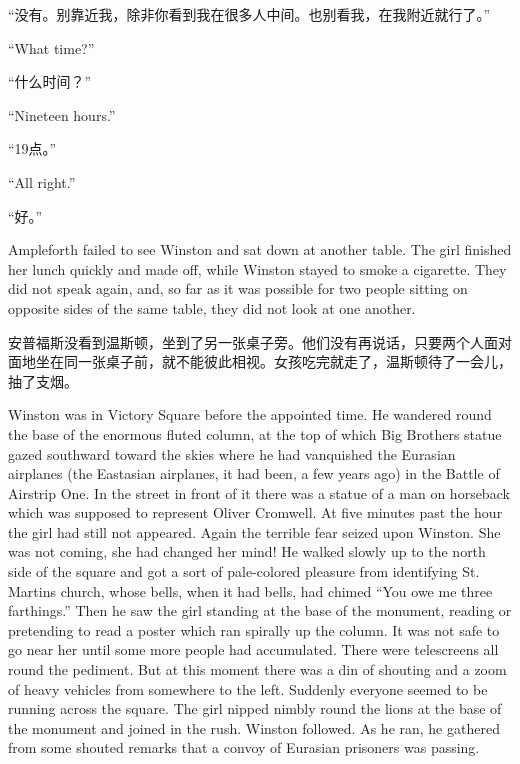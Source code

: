 \begin{paracol}{2}
\switchcolumn

``没有。别靠近我，除非你看到我在很多人中间。也别看我，在我附近就行了。''

\switchcolumn*

``What time?''

\switchcolumn

``什么时间？''

\switchcolumn*

``Nineteen hours.''

\switchcolumn

``19点。''

\switchcolumn*

``All right.''

\switchcolumn

``好。''

\switchcolumn*

Ampleforth failed to see Winston and sat down at another table. The girl
finished her lunch quickly and made off, while Winston stayed to smoke a
cigarette. They did not speak again, and, so far as it was possible for
two people sitting on opposite sides of the same table, they did not
look at one another.

\switchcolumn

安普福斯没看到温斯顿，坐到了另一张桌子旁。他们没有再说话，只要两个人面对面地坐在同一张桌子前，就不能彼此相视。女孩吃完就走了，温斯顿待了一会儿，抽了支烟。

\switchcolumn*

Winston was in Victory Square before the appointed time. He wandered
round the base of the enormous fluted column, at the top of which Big
Brother\textquotesingle s statue gazed southward toward the skies where
he had vanquished the Eurasian airplanes (the Eastasian airplanes, it
had been, a few years ago) in the Battle of Airstrip One. In the street
in front of it there was a statue of a man on horseback which was
supposed to represent Oliver Cromwell. At five minutes past the hour the
girl had still not appeared. Again the terrible fear seized upon
Winston. She was not coming, she had changed her mind! He walked slowly
up to the north side of the square and got a sort of pale-colored
pleasure from identifying St. Martin\textquotesingle s church, whose
bells, when it had bells, had chimed ``You owe me three farthings.'' Then
he saw the girl standing at the base of the monument, reading or
pretending to read a poster which ran spirally up the column. It was not
safe to go near her until some more people had accumulated. There were
telescreens all round the pediment. But at this moment there was a din
of shouting and a zoom of heavy vehicles from somewhere to the left.
Suddenly everyone seemed to be running across the square. The girl
nipped nimbly round the lions at the base of the monument and joined in
the rush. Winston followed. As he ran, he gathered from some shouted
remarks that a convoy of Eurasian prisoners was passing.


\end{paracol}

